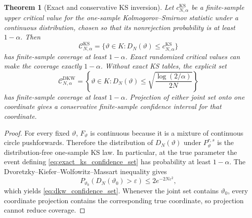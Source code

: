 \documentclass[11pt]{amsart}
\numberwithin{equation}{section}\setcounter{tocdepth}{3}\setcounter{secnumdepth}{3}
\newtheorem{theorem}{Theorem}[section]\newtheorem{proposition}[theorem]{Proposition}
\begin{document}
\begin{theorem}[Exact and conservative KS inversion]\label{thm:ks_inversion}
Let $c_{N,\alpha}^{\mathrm{KS}}$ be a finite-sample upper critical value for the one-sample
Kolmogorov--Smirnov statistic under a continuous distribution, chosen so that its
nonrejection probability is at least $1-\alpha$.  Then
\begin{equation}
 \mathcal C_{N,\alpha}^{\mathrm{KS}}
 =\{\vartheta\in K:D_N(\vartheta)\le c_{N,\alpha}^{\mathrm{KS}}\}
 \label{eq:exact_ks_confidence_set}
\end{equation}
has finite-sample coverage at least $1-\alpha$.  Exact randomized critical values can
make the coverage exactly $1-\alpha$.  Without exact KS tables, the explicit set
\begin{equation}
 \mathcal C_{N,\alpha}^{\mathrm{DKW}}
 =\left\{\vartheta\in K:
 D_N(\vartheta)\le
 \sqrt{\frac{\log(2/\alpha)}{2N}}\right\}
 \label{eq:dkw_confidence_set}
\end{equation}
has finite-sample coverage at least $1-\alpha$.  Projection of either joint set onto one
coordinate gives a conservative finite-sample confidence interval for that coordinate.
\end{theorem}
\begin{proof}
For every fixed $\vartheta$, $F_\vartheta$ is continuous because it is a mixture of
continuous circle pushforwards.  Therefore the distribution of
$D_N(\vartheta)$ under $P_\vartheta^{r,s}$ is the distribution-free one-sample KS law.
In particular, at the true parameter the event defining
\eqref{eq:exact_ks_confidence_set} has probability at least $1-\alpha$.
The Dvoretzky--Kiefer--Wolfowitz--Massart inequality
\cite{Massart1990} gives
\begin{equation}
 P_{\vartheta_0}\left(D_N(\vartheta_0)>\varepsilon\right)
 \le2e^{-2N\varepsilon^2},
 \label{eq:dkw_inequality}
\end{equation}
which yields \eqref{eq:dkw_confidence_set}.  Whenever the joint set contains
$\vartheta_0$, every coordinate projection contains the corresponding true coordinate,
so projection cannot reduce coverage.
\end{proof}
\end{document}
